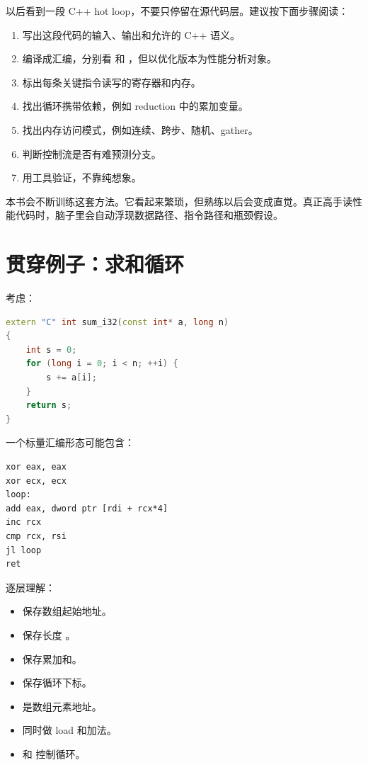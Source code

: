 以后看到一段 C++ hot loop，不要只停留在源代码层。建议按下面步骤阅读：

\begin{enumerate}
  \item 写出这段代码的输入、输出和允许的 C++ 语义。
  \item 编译成汇编，分别看  和 ，但以优化版本为性能分析对象。
  \item 标出每条关键指令读写的寄存器和内存。
  \item 找出循环携带依赖，例如 reduction 中的累加变量。
  \item 找出内存访问模式，例如连续、跨步、随机、gather。
  \item 判断控制流是否有难预测分支。
  \item 用工具验证，不靠纯想象。
\end{enumerate}

本书会不断训练这套方法。它看起来繁琐，但熟练以后会变成直觉。真正高手读性能代码时，脑子里会自动浮现数据路径、指令路径和瓶颈假设。

\section{贯穿例子：求和循环}

考虑：

\begin{lstlisting}[language=C++]
extern "C" int sum_i32(const int* a, long n)
{
    int s = 0;
    for (long i = 0; i < n; ++i) {
        s += a[i];
    }
    return s;
}
\end{lstlisting}

一个标量汇编形态可能包含：

\begin{lstlisting}
xor eax, eax
xor ecx, ecx
loop:
add eax, dword ptr [rdi + rcx*4]
inc rcx
cmp rcx, rsi
jl loop
ret
\end{lstlisting}

逐层理解：

\begin{itemize}
  \item {} 保存数组起始地址。
  \item {} 保存长度 。
  \item {} 保存累加和。
  \item {} 保存循环下标。
  \item {} 是数组元素地址。
  \item {} 同时做 load 和加法。
  \item {} 和  控制循环。
\end{itemize}

